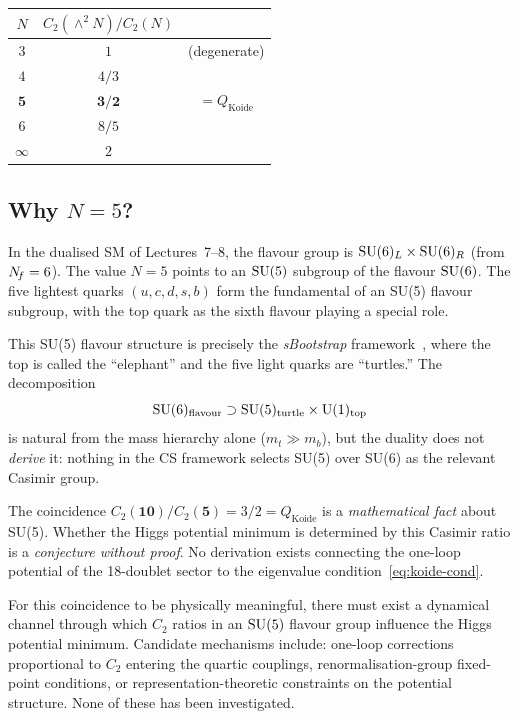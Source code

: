 \documentclass[11pt,a4paper]{article}
\begin{document}
\begin{center}\small
\begin{tabular}{@{}ccc@{}}
\toprule
$N$ & $C_2(\wedge^2 N)/C_2(N)$ & \\
\midrule
$3$ & $1$ & (degenerate) \\
$4$ & $4/3$ & \\
$\mathbf{5}$ & $\mathbf{3/2}$ & $= Q_{\text{Koide}}$ \\
$6$ & $8/5$ & \\
$\infty$ & $2$ & \\
\bottomrule
\end{tabular}
\end{center}

\subsection{Why \texorpdfstring{$N = 5$}{N = 5}?}

In the dualised SM of Lectures~7--8, the flavour group is
$\mathrm{SU}(6)_L \times \mathrm{SU}(6)_R$ (from $N_{\!f} = 6$).  The value $N = 5$
points to an $\mathrm{SU}(5)$ subgroup of the flavour $\mathrm{SU}(6)$.
The five lightest quarks $(u,c,d,s,b)$ form the fundamental
of an SU(5) flavour subgroup, with the top quark as the sixth
flavour playing a special role.

This SU(5) flavour structure is precisely the \emph{sBootstrap}
framework~\cite{Rivero2009,Rivero2024}, where the top is called
the ``elephant'' and the five light quarks are ``turtles.''
The decomposition
\begin{equation}
  \mathrm{SU}(6)_{\text{flavour}} \supset \mathrm{SU}(5)_{\text{turtle}}
  \times \mathrm{U}(1)_{\text{top}}
\end{equation}
is natural from the mass hierarchy alone ($m_t \gg m_b$), but
the duality does not \emph{derive} it: nothing in the CS framework
selects SU(5) over SU(6) as the relevant Casimir group.

\begin{warningbox}
The coincidence $C_2(\mathbf{10})/C_2(\mathbf{5}) = 3/2
= Q_{\text{Koide}}$ is a \emph{mathematical fact} about SU(5).
Whether the Higgs potential minimum is determined by this
Casimir ratio is a \emph{conjecture without proof}.  No
derivation exists connecting the one-loop potential of the
18-doublet sector to the eigenvalue condition~\eqref{eq:koide-cond}.
\end{warningbox}

For this coincidence to be physically meaningful, there must exist
a dynamical channel through which $C_2$ ratios in an $\mathrm{SU}(5)$
flavour group influence the Higgs potential minimum.  Candidate
mechanisms include: one-loop corrections proportional to $C_2$
entering the quartic couplings, renormalisation-group fixed-point
conditions, or representation-theoretic constraints on the
potential structure.  None of these has been investigated.
\end{document}
